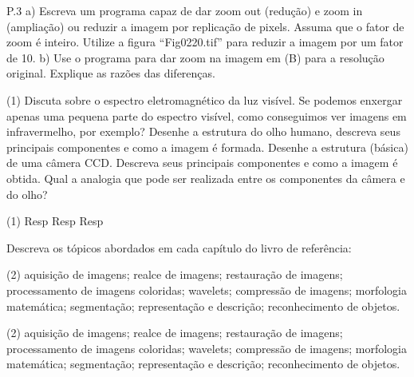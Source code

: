 \documentclass[12pt,a4paper]{article}
\begin{document}
P.3 a) Escreva um programa capaz de dar zoom out (redução) e zoom in (ampliação) ou reduzir a imagem por replicação de pixels. Assuma que o fator de zoom é inteiro. Utilize a figura “Fig0220.tif” para reduzir a imagem por um fator de 10.
b) Use o programa para dar zoom na imagem em (B) para a resolução original. Explique as razões das diferenças.


\begin{question}{1}
    \begin{tasks}(1)
        \task Discuta sobre o espectro eletromagnético da luz visível.
        \task Se podemos enxergar apenas uma pequena parte do espectro visível, como conseguimos ver imagens em infravermelho, por exemplo?
        \task Desenhe a estrutura do olho humano, descreva seus principais componentes e como a imagem é formada.
        \task Desenhe a estrutura (básica) de uma câmera CCD. Descreva seus principais componentes e como a imagem é obtida.
        \task Qual a analogia que pode ser realizada entre os componentes da câmera e do olho?
    \end{tasks}
\end{question}

\begin{solution}
    \begin{tasks}(1)
        \task Resp
        \task Resp 
        \task Resp
    \end{tasks}
\end{solution}


\begin{question}{1}
    Descreva os tópicos abordados em cada capítulo do livro de referência:
    \begin{tasks}(2)
        \task aquisição de imagens;
        \task realce de imagens;
        \task restauração de imagens;
        \task processamento de imagens coloridas;
        \task wavelets;
        \task compressão de imagens;
        \task morfologia matemática;
        \task segmentação;
        \task representação e descrição;
        \task reconhecimento de objetos.
    \end{tasks}
\end{question}

\begin{solution}
    \begin{tasks}(2)
        \task aquisição de imagens;
        \task realce de imagens;
        \task restauração de imagens;
        \task processamento de imagens coloridas;
        \task wavelets;
        \task compressão de imagens;
        \task morfologia matemática;
        \task segmentação;
        \task representação e descrição;
        \task reconhecimento de objetos.
    \end{tasks}
\end{solution}
\end{document}
